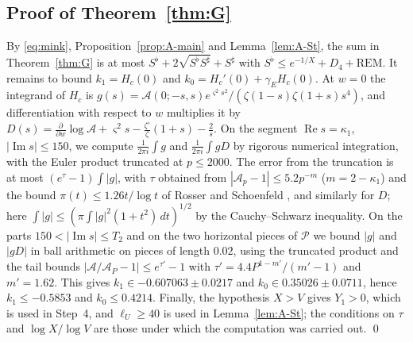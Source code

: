 \documentclass[11pt]{amsart}
\numberwithin{equation}{section}
\theoremstyle{definition}
\theoremstyle{remark}
\newcommand{\Rp}{\operatorname{Re}}
\newcommand{\Ip}{\operatorname{Im}}
\begin{document}
\subsection{Proof of Theorem~\ref{thm:G}}

By \eqref{eq:mink}, Proposition~\ref{prop:A-main} and Lemma~\ref{lem:A-St}, the sum in Theorem~\ref{thm:G} is at most $S^\flat + 2\sqrt{S^\flat S^\sharp} + S^\sharp$ with $S^\flat \leq e^{-1/X} + D_4 + \mathrm{REM}$.
It remains to bound $k_1 = H_c(0)$ and $k_0 = H_c'(0) + \gamma_EH_c(0)$.
At $w = 0$ the integrand of $H_c$ is $g(s) = \mathcal A(0; -s, s)e^{\varsigma^2s^2}/(\zeta(1 - s)\zeta(1 + s)s^4)$, and differentiation with respect to $w$ multiplies it by $D(s) = \frac{\partial}{\partial w}\log\mathcal A + \varsigma^2s - \frac{\zeta'}{\zeta}(1 + s) - \frac2s$.
On the segment $\Rp s = \kappa_1$, $|\Ip s| \leq 150$, we compute $\frac1{2\pi i}\int g$ and $\frac1{2\pi i}\int gD$ by rigorous numerical integration, with the Euler product truncated at $p \leq 2000$.
The error from the truncation is at most $(e^\tau - 1)\int|g|$, with $\tau$ obtained from $|\mathcal A_p - 1| \leq 5.2p^{-m}$ ($m = 2 - \kappa_1$) and the bound $\pi(t) \leq 1.26t/\log t$ of Rosser and Schoenfeld \cite{RS62}, and similarly for $D$; here $\int|g| \leq (\pi\int|g|^2(1 + t^2)\,dt)^{1/2}$ by the Cauchy--Schwarz inequality.
On the parts $150 < |\Ip s| \leq T_2$ and on the two horizontal pieces of $\mathcal P$ we bound $|g|$ and $|gD|$ in ball arithmetic on pieces of length $0.02$, using the truncated product and the tail bounds $|\mathcal A/\mathcal A_P - 1| \leq e^{\tau'} - 1$ with $\tau' = 4.4P^{1-m'}/(m' - 1)$ and $m' = 1.62$.
This gives $k_1 \in -0.607063 \pm 0.0217$ and $k_0 \in 0.35026 \pm 0.0711$, hence $k_1 \leq -0.5853$ and $k_0 \leq 0.4214$.
Finally, the hypothesis $X > V$ gives $Y_1 > 0$, which is used in Step~4, and $\ell_U \geq 40$ is used in Lemma~\ref{lem:A-St}; the conditions on $\tau$ and $\log X/\log V$ are those under which the computation was carried out.
\qed
\end{document}
